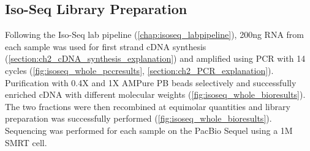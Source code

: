 \subsection{Iso-Seq Library Preparation}
Following the Iso-Seq lab pipeline (\cref{chap:isoseq_labpipeline}), 200ng RNA from each sample was used for first strand cDNA synthesis (\cref{section:ch2_cDNA_synthesis_explanation}) and amplified using PCR with 14 cycles (\cref{fig:isoseq_whole_pccresults}, \cref{section:ch2_PCR_explanation}). Purification with 0.4X and 1X AMPure PB beads selectively and successfully enriched cDNA with different molecular weights (\cref{fig:isoseq_whole_bioresults}). The two fractions were then recombined at equimolar quantities and library preparation was successfully performed (\cref{fig:isoseq_whole_bioresults}). Sequencing was performed for each sample on the PacBio Sequel using a 1M SMRT cell.
    
